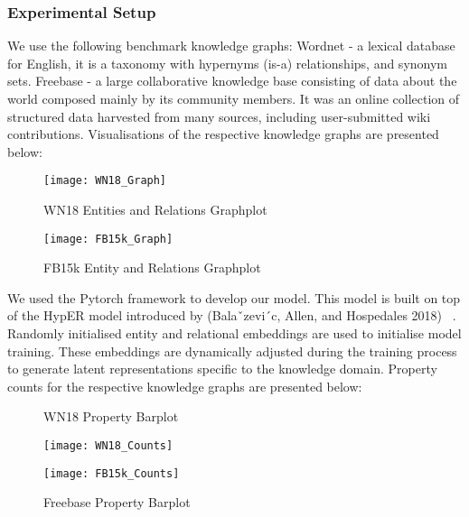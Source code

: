 \subsubsection{Experimental Setup} 

We use the following benchmark knowledge graphs: Wordnet - a lexical database for English, it is a taxonomy with hypernyms (is-a) relationships, and synonym sets. \newline
Freebase - a large collaborative knowledge base consisting of data about the world composed mainly by its community members. It was an online collection of structured data harvested from many sources, including user-submitted wiki contributions. \newline
Visualisations of the respective knowledge graphs are presented below:

\begin{figure}[H]
  	\caption{WN18 Entities and Relations Graphplot}
   	\centering
    	\texttt{[image: WN18\_Graph]}
\end{figure}

\begin{figure}[H]
  	\caption{FB15k Entity and Relations Graphplot}
   	\centering
    	\texttt{[image: FB15k\_Graph]}
\end{figure}


We used the Pytorch framework to develop our model. This model is built on top of the HypER model introduced by (Balaˇzevi´c, Allen, and Hospedales 2018) ~\citep{balazevic2019hypernetwork}.  Randomly initialised entity and relational embeddings are used to initialise model training. These embeddings are dynamically adjusted during the training process to generate latent representations specific to the knowledge domain. Property counts for the respective knowledge graphs are presented below:

\begin{figure}[H]
	\parbox{.5\linewidth}{
   		\caption{WN18 Property Barplot}
   		\centering
    		\texttt{[image: WN18\_Counts]}
		}
	\hfill
	\parbox{.5\linewidth}{
		\caption{Freebase Property Barplot}
   		\centering
    		\texttt{[image: FB15k\_Counts]}
		}
\end{figure}


